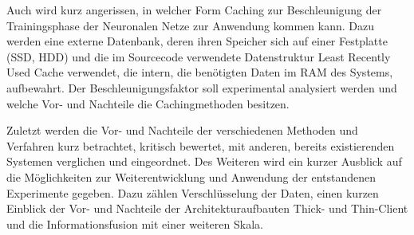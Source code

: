 Auch wird kurz angerissen, in welcher Form Caching zur Beschleunigung der Trainingsphase der Neuronalen Netze zur Anwendung kommen kann. Dazu werden eine externe Datenbank, deren ihren Speicher sich auf einer Festplatte (SSD, HDD) und die im Sourcecode verwendete Datenstruktur Least Recently Used Cache verwendet, die intern, die benötigten Daten im RAM des Systems, aufbewahrt. Der Beschleunigungsfaktor soll experimental analysiert werden und welche Vor- und Nachteile die Cachingmethoden besitzen.

Zuletzt werden die Vor- und Nachteile der verschiedenen Methoden und Verfahren kurz betrachtet, kritisch bewertet, mit anderen, bereits existierenden Systemen verglichen und eingeordnet. Des Weiteren wird ein kurzer Ausblick auf die Möglichkeiten zur Weiterentwicklung und Anwendung der entstandenen Experimente gegeben. Dazu zählen Verschlüsselung der Daten, einen kurzen Einblick der Vor- und Nachteile der Architekturaufbauten Thick- und Thin-Client und die Informationsfusion mit einer weiteren Skala.
